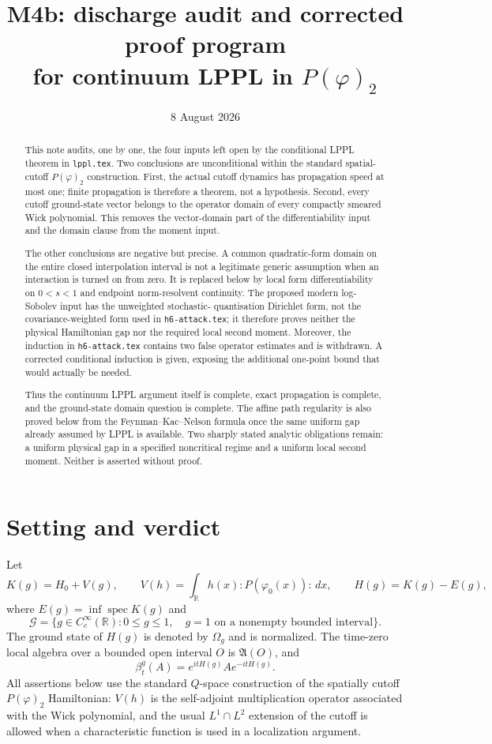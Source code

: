 \documentclass[11pt,a4paper]{article}
\title{M4b: discharge audit and corrected proof program\\
for continuum LPPL in $P(\varphi)_2$}
\author{}
\date{8 August 2026}
\theoremstyle{remark}
\newcommand{\R}{\mathbb R}
\newcommand{\A}{\mathfrak A}
\newcommand{\Om}{\Omega}
\newcommand{\G}{\mathcal G}
\DeclareMathOperator{\spec}{spec}
\begin{document}
\maketitle

\begin{abstract}
This note audits, one by one, the four inputs left open by the conditional LPPL theorem in
\texttt{lppl.tex}.  Two conclusions are unconditional within the standard spatial-cutoff
$P(\varphi)_2$ construction.  First, the actual cutoff dynamics has propagation speed at most one;
finite propagation is therefore a theorem, not a hypothesis.  Second, every cutoff ground-state
vector belongs to the operator domain of every compactly smeared Wick polynomial.  This removes
the vector-domain part of the differentiability input and the domain clause from the moment input.

The other conclusions are negative but precise.  A common quadratic-form domain on the entire
closed interpolation interval is not a legitimate generic assumption when an interaction is
turned on from zero.  It is replaced below by local form differentiability on $0<s<1$ and endpoint
norm-resolvent continuity.  The proposed modern log-Sobolev input has the unweighted stochastic-
quantisation Dirichlet form, not the covariance-weighted form used in \texttt{h6-attack.tex}; it
therefore proves neither the physical Hamiltonian gap nor the required local second moment.
Moreover, the induction in \texttt{h6-attack.tex} contains two false operator estimates and is
withdrawn.  A corrected conditional induction is given, exposing the additional one-point bound
that would actually be needed.

Thus the continuum LPPL argument itself is complete, exact propagation is complete, and the
ground-state domain question is complete.  The affine path regularity is also proved below from
the Feynman--Kac--Nelson formula once the same uniform gap already assumed by LPPL is available.
Two sharply stated analytic obligations remain: a uniform physical gap in a specified noncritical
regime and a uniform local second moment.  Neither is asserted without proof.
\end{abstract}

\section{Setting and verdict}

Let
\[
 K(g)=H_0+V(g),\qquad
 V(h)=\int_{\R}h(x):P(\varphi_0(x)):\,dx,
 \qquad H(g)=K(g)-E(g),
\]
where $E(g)=\inf\spec K(g)$ and
\[
 \G=\{g\in C_c^\infty(\R):0\le g\le1,\quad
             g=1\text{ on a nonempty bounded interval}\}.
\]
The ground state of $H(g)$ is denoted by $\Om_g$ and is normalized.  The time-zero local algebra
over a bounded open interval $O$ is $\A(O)$, and
\[
 \beta_t^g(A)=e^{itH(g)}Ae^{-itH(g)}.
\]
All assertions below use the standard $Q$-space construction of the spatially cutoff
$P(\varphi)_2$ Hamiltonian: $V(h)$ is the self-adjoint multiplication operator associated with the
Wick polynomial, and the usual $L^1\cap L^2$ extension of the cutoff is allowed when a
characteristic function is used in a localization argument.
\end{document}
